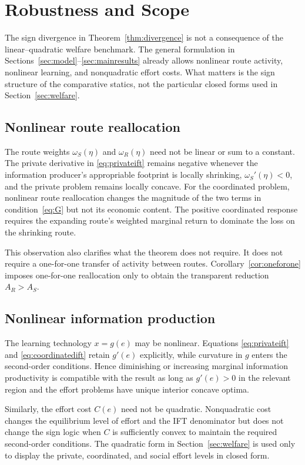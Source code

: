 \section{Robustness and Scope}\label{sec:robustness}

The sign divergence in Theorem~\ref{thm:divergence} is not a consequence of the linear--quadratic welfare benchmark. The general formulation in Sections~\ref{sec:model}--\ref{sec:mainresults} already allows nonlinear route activity, nonlinear learning, and nonquadratic effort costs. What matters is the sign structure of the comparative statics, not the particular closed forms used in Section~\ref{sec:welfare}.

\subsection{Nonlinear route reallocation}

The route weights $\omega_S(\eta)$ and $\omega_R(\eta)$ need not be linear or sum to a constant. The private derivative in \eqref{eq:privateift} remains negative whenever the information producer's appropriable footprint is locally shrinking, $\omega_S'(\eta)<0$, and the private problem remains locally concave. For the coordinated problem, nonlinear route reallocation changes the magnitude of the two terms in condition~\eqref{eq:G} but not its economic content. The positive coordinated response requires the expanding route's weighted marginal return to dominate the loss on the shrinking route.

This observation also clarifies what the theorem does not require. It does not require a one-for-one transfer of activity between routes. Corollary~\ref{cor:oneforone} imposes one-for-one reallocation only to obtain the transparent reduction $A_R>A_S$.

\subsection{Nonlinear information production}

The learning technology $x=g(e)$ may be nonlinear. Equations \eqref{eq:privateift} and \eqref{eq:coordinatedift} retain $g'(e)$ explicitly, while curvature in $g$ enters the second-order conditions. Hence diminishing or increasing marginal information productivity is compatible with the result as long as $g'(e)>0$ in the relevant region and the effort problems have unique interior concave optima.

Similarly, the effort cost $C(e)$ need not be quadratic. Nonquadratic cost changes the equilibrium level of effort and the IFT denominator but does not change the sign logic when $C$ is sufficiently convex to maintain the required second-order conditions. The quadratic form in Section~\ref{sec:welfare} is used only to display the private, coordinated, and social effort levels in closed form.


